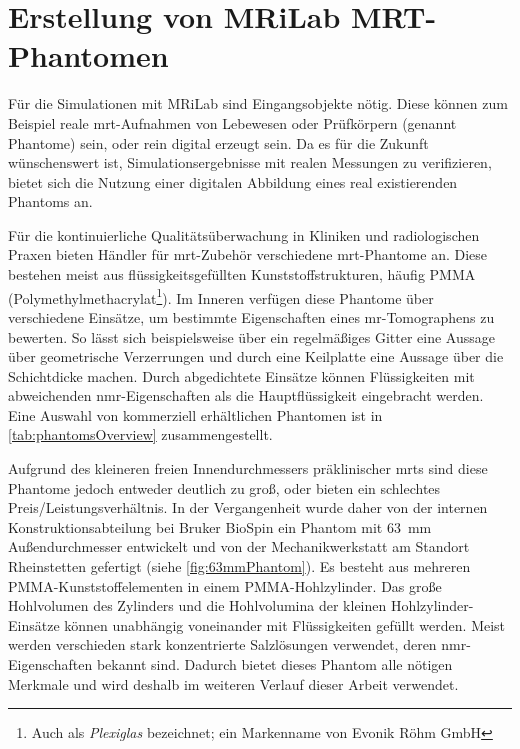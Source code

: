 









\section{Erstellung von MRiLab MRT-Phantomen}
Für die Simulationen mit MRiLab sind Eingangsobjekte nötig. Diese können zum Beispiel reale \gls{mrt}-Aufnahmen von Lebewesen oder Prüfkörpern (genannt Phantome) sein, oder rein digital erzeugt sein. Da es für die Zukunft wünschenswert ist, Simulationsergebnisse mit realen Messungen zu verifizieren, bietet sich die Nutzung einer digitalen Abbildung eines real existierenden Phantoms an.

Für die kontinuierliche Qualitätsüberwachung in Kliniken und radiologischen Praxen bieten Händler für \gls{mrt}-Zubehör verschiedene \gls{mrt}-Phantome an. Diese bestehen meist aus flüssigkeitsgefüllten Kunststoffstrukturen, häufig PMMA (Polymethylmethacrylat\footnote{Auch als \textit{Plexiglas} bezeichnet; ein Markenname von Evonik Röhm GmbH}). Im Inneren verfügen diese Phantome über verschiedene Einsätze, um bestimmte Eigenschaften eines \gls{mr}-Tomographens zu bewerten. So lässt sich beispielsweise über ein regelmäßiges Gitter eine Aussage über geometrische Verzerrungen und durch eine Keilplatte eine Aussage über die Schichtdicke machen. Durch abgedichtete Einsätze können Flüssigkeiten mit abweichenden \gls{nmr}-Eigenschaften als die Hauptflüssigkeit eingebracht werden. Eine Auswahl von kommerziell erhältlichen Phantomen ist in \autoref{tab:phantomsOverview} zusammengestellt.

Aufgrund des kleineren freien Innendurchmessers präklinischer \gls{mrt}s sind diese Phantome jedoch entweder deutlich zu groß, oder bieten ein schlechtes Preis/Leistungsverhältnis. In der Vergangenheit wurde daher von der internen Konstruktionsabteilung bei Bruker BioSpin ein Phantom mit \SI{63}{\mm} Außendurchmesser entwickelt und von der Mechanikwerkstatt am Standort Rheinstetten gefertigt (siehe \autoref{fig:63mmPhantom}). Es besteht aus mehreren PMMA-Kunststoffelementen in einem PMMA-Hohlzylinder. Das große Hohlvolumen des Zylinders und die Hohlvolumina der kleinen Hohlzylinder-Einsätze können unabhängig voneinander mit Flüssigkeiten gefüllt werden. Meist werden verschieden stark konzentrierte Salzlösungen verwendet, deren \gls{nmr}-Eigenschaften bekannt sind. Dadurch bietet dieses Phantom alle nötigen Merkmale und wird deshalb im weiteren Verlauf dieser Arbeit verwendet.

